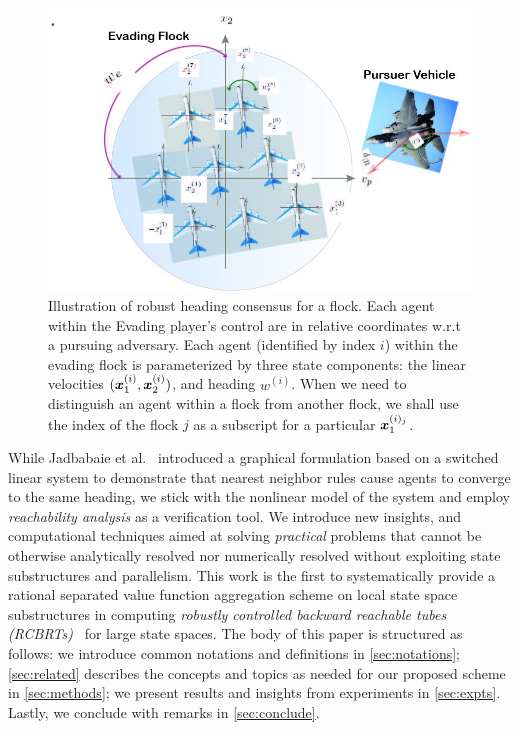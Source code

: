 \begin{figure}[tb!]
	\centering
	\includegraphics[width=\columnwidth]{figures/flock_pursuer.jpg}
	\caption{Illustration of robust heading consensus for a flock. Each agent within the Evading player's control are in relative coordinates w.r.t a pursuing adversary. Each agent (identified by index $i$) within the evading flock is parameterized by three state components: the linear velocities $(\bm{x}_1^{(i)}, \bm{x}_2^{(i)})$, and heading $w^{(i)}$. When we need to distinguish an agent within a flock from another flock, we shall use the index of the flock \eg $j$ as a subscript for a particular \eg  $\bm{x}_1^{(i)_j}$.}
	\label{fig:robust_heading}
\end{figure}
%
While Jadbabaie et al.~\cite{JadbabaieCoord} introduced a graphical formulation based on a switched linear system to demonstrate that nearest neighbor rules cause agents to converge to the same heading, we stick with the nonlinear model of the system and employ \textit{reachability analysis} as a verification tool.  We introduce new insights, and computational techniques aimed at solving \textit{practical} problems that cannot be otherwise analytically resolved nor numerically resolved without exploiting state substructures and parallelism. This work is the first to systematically provide a rational separated value function aggregation  scheme on local state space substructures in computing \textit{robustly controlled backward reachable tubes  (RCBRTs)}~\cite{Mitchell2020} for large state spaces. The body of this paper is structured as follows: we introduce common notations and definitions in \autoref{sec:notations}; \autoref{sec:related} describes the concepts and topics as needed for our proposed scheme in \autoref{sec:methods}; we present results and insights from experiments in \autoref{sec:expts}. Lastly, we  conclude with remarks in \autoref{sec:conclude}.  